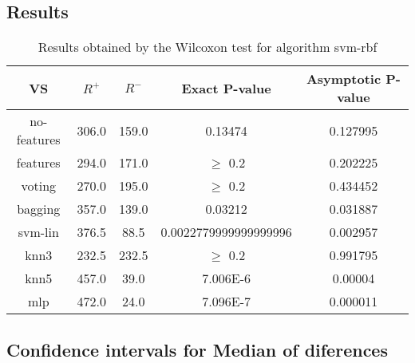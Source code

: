\documentclass[a4paper,10pt]{article}
\begin{document}
\subsection{Results}

\begin{table}[!htp]
\centering\small
\begin{tabular}{
|c|c|c|c|c|}
\hline
 VS & $R^{+}$ & $R^{-}$ & Exact P-value & Asymptotic P-value \\ \hline 
no-features & 306.0 & 159.0 & 0.13474 & 0.127995\\ \hline 
features & 294.0 & 171.0 & $\geq$ 0.2 & 0.202225\\ \hline 
voting & 270.0 & 195.0 & $\geq$ 0.2 & 0.434452\\ \hline 
bagging & 357.0 & 139.0 & 0.03212 & 0.031887\\ \hline 
svm-lin & 376.5 & 88.5 & 0.0022779999999999996 & 0.002957\\ \hline 
knn3 & 232.5 & 232.5 & $\geq$ 0.2 & 0.991795\\ \hline 
knn5 & 457.0 & 39.0 & 7.006E-6 & 0.00004\\ \hline 
mlp & 472.0 & 24.0 & 7.096E-7 & 0.000011\\ \hline 

\end{tabular}
\caption{Results obtained by the Wilcoxon test for algorithm svm-rbf}
\end{table}

\subsection{Confidence intervals for Median of diferences}
\end{document}
